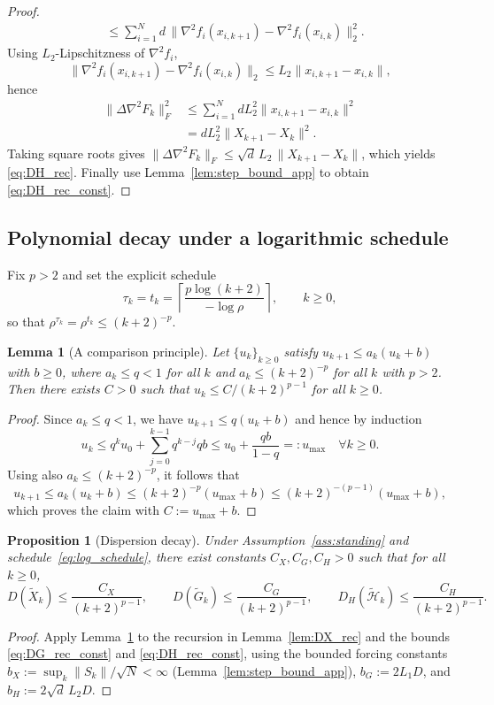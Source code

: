 \documentclass[10pt,twocolumn,letterpaper]{article}
\theoremstyle{compact}
\newtheorem{lemma}[theorem]{Lemma}
\newtheorem{proposition}[theorem]{Proposition}
\theoremstyle{compactremark}
\begin{document}
\begin{proof}
\begin{align*}
&\le \textstyle\sum_{i=1}^N d\,\|\nabla^2 f_i(x_{i,k+1})\!-\!\nabla^2 f_i(x_{i,k})\|_2^2.
\end{align*}
Using $L_2$-Lipschitzness of $\nabla^2 f_i$,
\[
\|\nabla^2 f_i(x_{i,k+1})\!-\!\nabla^2 f_i(x_{i,k})\|_2\le L_2\|x_{i,k+1}\!-\!x_{i,k}\|,
\]
hence
\begin{align*}
\|\Delta\nabla^2 F_k\|_F^2
&\le \textstyle\sum_{i=1}^N d L_2^2\|x_{i,k+1}\!-\!x_{i,k}\|^2\\
&= dL_2^2\|X_{k+1}\!-\!X_k\|^2.
\end{align*}
Taking square roots gives $\|\Delta\nabla^2 F_k\|_F\le \sqrt d\,L_2\,\|X_{k+1}-X_k\|$,
which yields \eqref{eq:DH_rec}. Finally use Lemma~\ref{lem:step_bound_app} to obtain \eqref{eq:DH_rec_const}.
\end{proof}

\subsection{Polynomial decay under a logarithmic schedule}

Fix $p>2$ and set the explicit schedule
\begin{equation}\label{eq:log_schedule}
\tau_k=t_k=\left\lceil \frac{p\log(k+2)}{-\log\rho}\right\rceil,\qquad k\ge 0,
\end{equation}
so that $\rho^{\tau_k}=\rho^{t_k}\le (k+2)^{-p}$.

\begin{lemma}[A comparison principle]\label{lem:compare}
Let $\{u_k\}_{k\ge0}$ satisfy $u_{k+1}\le a_k(u_k+b)$ with $b\ge0$, where
$a_k\le q<1$ for all $k$ and $a_k\le (k+2)^{-p}$ for all $k$ with $p>2$.
Then there exists $C>0$ such that $u_k\le C/(k+2)^{p-1}$ for all $k\ge0$.
\end{lemma}
\begin{proof}
Since $a_k\le q<1$, we have $u_{k+1}\le q(u_k+b)$ and hence by induction
\[
u_k\le q^k u_0+\sum_{j=0}^{k-1} q^{k-j}qb \le u_0+\frac{qb}{1-q}=:u_{\max}\quad \forall k\ge 0.
\]
Using also $a_k\le (k+2)^{-p}$, it follows that
\[
u_{k+1}\le a_k(u_k+b)\le (k+2)^{-p}(u_{\max}+b)\le (k+2)^{-(p-1)}(u_{\max}+b),
\]
which proves the claim with $C:=u_{\max}+b$.
\end{proof}

\begin{proposition}[Dispersion decay]\label{prop:dispersion_decay}
Under Assumption~\ref{ass:standing} and schedule~\eqref{eq:log_schedule},
there exist constants $C_X,C_G,C_H>0$ such that for all $k\ge0$,
\[
D(\tilde X_k)\le \frac{C_X}{(k+2)^{p-1}},
\qquad
D(\tilde G_k)\le \frac{C_G}{(k+2)^{p-1}},
\qquad
D_H(\tilde{\mathcal H}_k)\le \frac{C_H}{(k+2)^{p-1}}.
\]
\end{proposition}
\begin{proof}
Apply Lemma~\ref{lem:compare} to the recursion in Lemma~\ref{lem:DX_rec} and the bounds \eqref{eq:DG_rec_const} and \eqref{eq:DH_rec_const},
using the bounded forcing constants $b_X:=\sup_k\|S_k\|/\sqrt N<\infty$ (Lemma~\ref{lem:step_bound_app}),
$b_G:=2L_1D$, and $b_H:=2\sqrt d\,L_2D$.
\end{proof}
\end{document}
